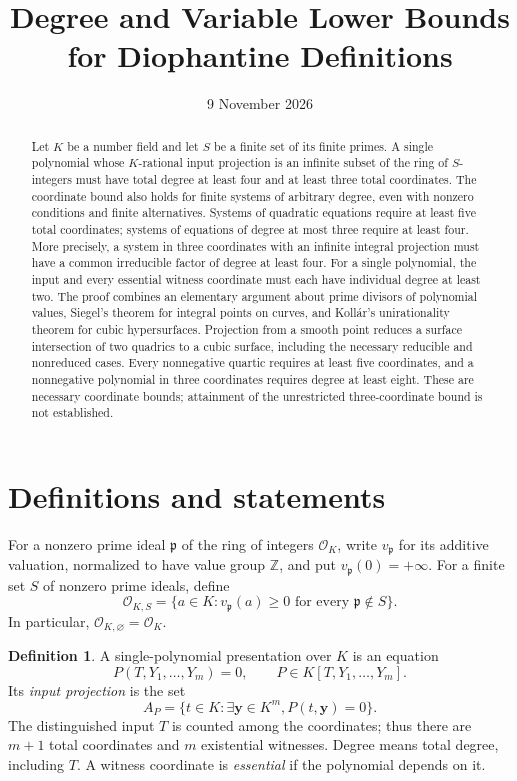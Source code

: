 \documentclass[11pt,a4paper]{article}
\title{Degree and Variable Lower Bounds\\for Diophantine Definitions}
\author{}
\date{9 November 2026}
\theoremstyle{definition}
\newtheorem{definition}[theorem]{Definition}
\newcommand{\OKS}{\mathcal O_{K,S}}
\begin{document}
\maketitle
\begin{abstract}
Let $K$ be a number field and let $S$ be a finite set of its finite
primes. A single polynomial whose $K$-rational input projection is
an infinite subset of the ring of $S$-integers must have total
degree at least four and at least three total coordinates. The
coordinate bound also holds for finite systems of arbitrary degree,
even with nonzero conditions and finite alternatives. Systems of
quadratic equations require at least five total coordinates; systems
of equations of degree at most three require at least four. More
precisely, a system in three coordinates with an
infinite integral projection must have a common irreducible factor
of degree at least four. For a single polynomial, the input and every essential witness coordinate must
each have individual degree at least two. The proof combines an
elementary argument about prime divisors of polynomial values,
Siegel's theorem for integral points on curves, and Koll\'ar's
unirationality theorem for cubic hypersurfaces. Projection from a
smooth point reduces a surface intersection of two quadrics to a
cubic surface, including the necessary reducible and nonreduced
cases. Every nonnegative quartic requires at least five coordinates,
and a nonnegative polynomial in three coordinates requires
degree at least eight. These are necessary coordinate bounds;
attainment of the unrestricted three-coordinate bound is not established.
\end{abstract}

\section{Definitions and statements}

For a nonzero prime ideal $\mathfrak p$ of the ring of integers
$\mathcal O_K$, write $v_{\mathfrak p}$ for its additive valuation,
normalized to have value group $\mathbb Z$, and put
$v_{\mathfrak p}(0)=+\infty$. For a finite set $S$ of nonzero
prime ideals, define
\[
 \OKS=\{a\in K: v_{\mathfrak p}(a)\ge0
                       \text{ for every }\mathfrak p\notin S\}.
\]
In particular, $\mathcal O_{K,\varnothing}=\mathcal O_K$.

\begin{definition}
A single-polynomial presentation over $K$ is an equation
\[
                P(T,Y_1,\ldots,Y_m)=0,
       \qquad P\in K[T,Y_1,\ldots,Y_m].
\]
Its \emph{input projection} is the set
\[
 A_P=\{t\in K:\exists \mathbf y\in K^m, P(t,\mathbf y)=0\}.
\]
The distinguished input $T$ is counted among the coordinates; thus
there are $m+1$ total coordinates and $m$ existential witnesses.
Degree means total degree, including $T$. A witness coordinate is
\emph{essential} if the polynomial depends on it.
\end{definition}
\end{document}
